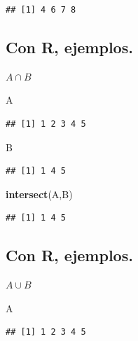 \documentclass[]{book}
\newenvironment{Shaded}{\begin{snugshade}}{\end{snugshade}}
\newcommand{\KeywordTok}[1]{\textcolor[rgb]{0.13,0.29,0.53}{\textbf{#1}}}
\newcommand{\NormalTok}[1]{#1}
\begin{document}
\begin{verbatim}
## [1] 4 6 7 8
\end{verbatim}

\hypertarget{con-r-ejemplos.-2}{%
\subsection{Con R, ejemplos.}\label{con-r-ejemplos.-2}}

\(A\cap B\)

\begin{Shaded}
\begin{Highlighting}[]
\NormalTok{A}
\end{Highlighting}
\end{Shaded}

\begin{verbatim}
## [1] 1 2 3 4 5
\end{verbatim}

\begin{Shaded}
\begin{Highlighting}[]
\NormalTok{B}
\end{Highlighting}
\end{Shaded}

\begin{verbatim}
## [1] 1 4 5
\end{verbatim}

\begin{Shaded}
\begin{Highlighting}[]
\KeywordTok{intersect}\NormalTok{(A,B)}
\end{Highlighting}
\end{Shaded}

\begin{verbatim}
## [1] 1 4 5
\end{verbatim}

\hypertarget{con-r-ejemplos.-3}{%
\subsection{Con R, ejemplos.}\label{con-r-ejemplos.-3}}

\(A\cup B\)

\begin{Shaded}
\begin{Highlighting}[]
\NormalTok{A}
\end{Highlighting}
\end{Shaded}

\begin{verbatim}
## [1] 1 2 3 4 5
\end{verbatim}
\end{document}
